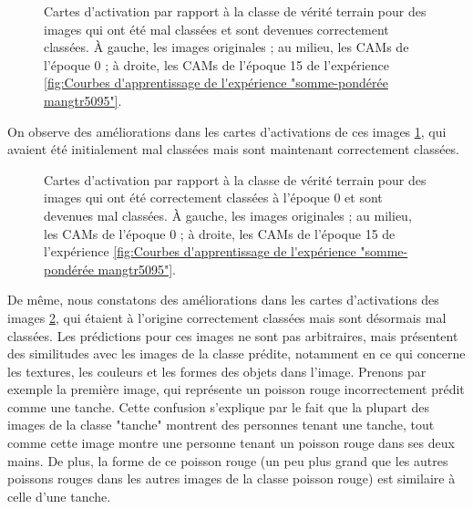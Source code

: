 \documentclass{report}
\begin{document}
{    \begin{figure}[htbp] 
	\centering
	\caption{Cartes d’activation par rapport à la classe de vérité terrain pour des images qui ont été mal classées et sont devenues correctement classées. À gauche, les images originales ; au milieu, les CAMs de l’époque 0 ; à droite, les CAMs de l’époque 15 de l'expérience \ref{fig:Courbes d'apprentissage de l'expérience "somme-pondérée mangtr5095"}.}
	\label{fig:Cams for improved images"}
    \end{figure}
\hspace{1cm}On observe des améliorations dans les cartes d'activations de ces images \ref{fig:Cams for improved images"}, qui avaient été initialement mal classées mais sont maintenant correctement classées.  
\newpage
    \begin{figure}[htbp] 
	\centering
	\caption{Cartes d’activation par rapport à la classe de vérité terrain pour des images qui ont été correctement classées à l'époque 0 et sont devenues mal classées. À gauche, les images originales ; au milieu, les CAMs de l’époque 0 ; à droite, les CAMs de l’époque 15 de l'expérience \ref{fig:Courbes d'apprentissage de l'expérience "somme-pondérée mangtr5095"}.}
	\label{fig:Cams for degraded images"}
    \end{figure}
\vspace*{1\baselineskip}

\hspace{1cm}De même, nous constatons des améliorations dans les cartes d'activations des images  \ref{fig:Cams for degraded images"}, qui étaient à l'origine correctement classées mais sont désormais mal classées. Les prédictions pour ces images ne sont pas arbitraires, mais présentent des similitudes avec les images de la classe prédite, notamment en ce qui concerne les textures, les couleurs et les formes des objets dans l'image.
\newpage
\hspace{1cm}Prenons par exemple la première image, qui représente un poisson rouge incorrectement prédit comme une tanche. Cette confusion s'explique par le fait que la plupart des images de la classe "tanche" montrent des personnes tenant une tanche, tout comme cette image montre une personne tenant un poisson rouge dans ses deux mains. De plus, la forme de ce poisson rouge (un peu plus grand que les autres poissons rouges dans les autres images de la classe poisson rouge) est similaire à celle d'une tanche.
\vspace*{1\baselineskip}

}
\end{document}
